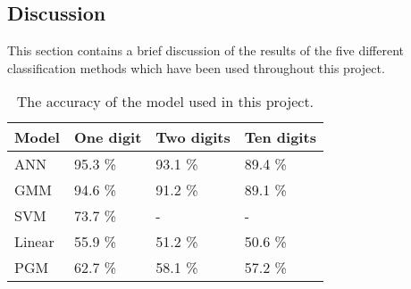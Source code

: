 \subsection*{Discussion}
This section contains a brief discussion of the results of the five different classification methods which have been used throughout this project. 

\begin{table}[h]
\begin{tabular}{@{}l|lll@{}}
\toprule
Model 		   		   & One digit            & Two digits  & Ten digits   \\ \midrule
ANN                    & 95.3 \%                & 93.1 \%   & 89.4 \% \\
GMM                    & 94.6 \%                & 91.2 \%   & 89.1 \% \\
SVM                    & 73.7 \%                & - 	    & -       \\ 
Linear                 & 55.9 \% 				& 51.2 \%   & 50.6 \% \\
PGM                    & 62.7 \% 				& 58.1 \%   & 57.2 \%
\end{tabular}
\caption{The accuracy of the model used in this project. }
\label{table:result}
\end{table}
